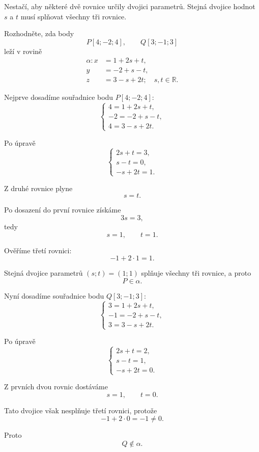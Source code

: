Nestačí, aby některé dvě rovnice určily dvojici parametrů. Stejná
dvojice hodnot $s$ a $t$ musí splňovat všechny tři rovnice.

\begin{example}
    \label{exa:Point_membership_parametric_plane}

    Rozhodněte, zda body
    \[
        P[4;-2;4],
        \qquad
        Q[3;-1;3]
    \]
    leží v rovině
    \[
        \begin{aligned}
            \alpha: x&=1+2s+t,\\
            y&=-2+s-t,\\
            z&=3-s+2t; \quad s,t\in\mathbb{R}.
        \end{aligned}
    \]

    Nejprve dosadíme souřadnice bodu $P[4;-2;4]$:
    \[
        \begin{cases}
            4=1+2s+t,\\
            -2=-2+s-t,\\
            4=3-s+2t.
        \end{cases}
    \]

    Po úpravě
    \[
        \begin{cases}
            2s+t=3,\\
            s-t=0,\\
            -s+2t=1.
        \end{cases}
    \]

    Z druhé rovnice plyne
    \[
        s=t.
    \]

    Po dosazení do první rovnice získáme
    \[
        3s=3,
    \]
    tedy
    \[
        s=1,
        \qquad
        t=1.
    \]

    Ověříme třetí rovnici:
    \[
        -1+2\cdot1=1.
    \]

    Stejná dvojice parametrů $(s;t)=(1;1)$ splňuje všechny tři
    rovnice, a proto
    \[
        P\in\alpha.
    \]

    Nyní dosadíme souřadnice bodu $Q[3;-1;3]$:
    \[
        \begin{cases}
            3=1+2s+t,\\
            -1=-2+s-t,\\
            3=3-s+2t.
        \end{cases}
    \]

    Po úpravě
    \[
        \begin{cases}
            2s+t=2,\\
            s-t=1,\\
            -s+2t=0.
        \end{cases}
    \]

    Z prvních dvou rovnic dostáváme
    \[
        s=1,
        \qquad
        t=0.
    \]

    Tato dvojice však nesplňuje třetí rovnici, protože
    \[
        -1+2\cdot0=-1\neq0.
    \]

    Proto
    \[
        Q\notin\alpha.
    \]
\end{example}

